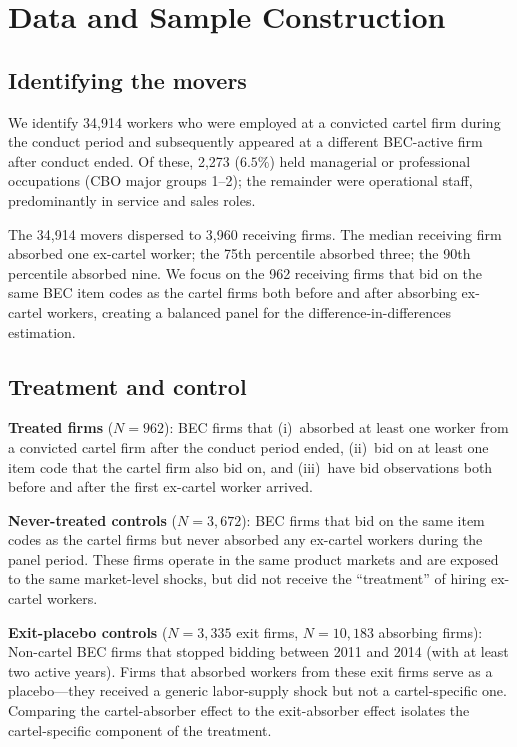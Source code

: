\section{Data and Sample Construction}\label{sec:data}

\subsection{Identifying the movers}

We identify 34{,}914 workers who were employed at a convicted cartel firm during the conduct period and subsequently appeared at a different BEC-active firm after conduct ended. Of these, 2{,}273 ($6.5\%$) held managerial or professional occupations (CBO major groups 1--2); the remainder were operational staff, predominantly in service and sales roles.

The 34{,}914 movers dispersed to 3{,}960 receiving firms. The median receiving firm absorbed one ex-cartel worker; the 75th percentile absorbed three; the 90th percentile absorbed nine. We focus on the 962 receiving firms that bid on the same BEC item codes as the cartel firms both before and after absorbing ex-cartel workers, creating a balanced panel for the difference-in-differences estimation.

\subsection{Treatment and control}

\textbf{Treated firms} ($N = 962$): BEC firms that (i)~absorbed at least one worker from a convicted cartel firm after the conduct period ended, (ii)~bid on at least one item code that the cartel firm also bid on, and (iii)~have bid observations both before and after the first ex-cartel worker arrived.

\textbf{Never-treated controls} ($N = 3{,}672$): BEC firms that bid on the same item codes as the cartel firms but never absorbed any ex-cartel workers during the panel period. These firms operate in the same product markets and are exposed to the same market-level shocks, but did not receive the ``treatment'' of hiring ex-cartel workers.

\textbf{Exit-placebo controls} ($N = 3{,}335$ exit firms, $N = 10{,}183$ absorbing firms): Non-cartel BEC firms that stopped bidding between 2011 and 2014 (with at least two active years). Firms that absorbed workers from these exit firms serve as a placebo---they received a generic labor-supply shock but not a cartel-specific one. Comparing the cartel-absorber effect to the exit-absorber effect isolates the cartel-specific component of the treatment.

